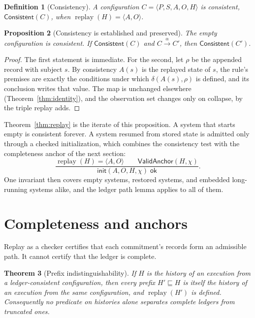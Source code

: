 \documentclass[11pt,openany]{book}
\newtheorem{theorem}{Theorem}[chapter]
\newtheorem{proposition}[theorem]{Proposition}
\newtheorem{definition}[theorem]{Definition}
\theoremstyle{remark}
\newcommand{\replay}{\operatorname{replay}}
\begin{document}
\begin{definition}[Consistency]
A configuration $C=\langle P,S,A,O,H\rangle$ is \emph{consistent},
$\mathsf{Consistent}(C)$, when $\replay(H)=\langle A,O\rangle$.
\end{definition}

\begin{proposition}[Consistency is established and preserved]
\label{prop:consistent}
The empty configuration is consistent. If $\mathsf{Consistent}(C)$ and
$C\xrightarrow{\alpha}C'$, then $\mathsf{Consistent}(C')$.
\end{proposition}

\begin{proof}
The first statement is immediate. For the second, let $\rho$ be the
appended record with subject $s$. By consistency $A(s)$ is the replayed
state of $s$, the rule's premises are exactly the conditions under which
$\delta(A(s),\rho)$ is defined, and its conclusion writes that value. The
map is unchanged elsewhere (Theorem~\ref{thm:identity}), and the
observation set changes only on collapse, by the triple replay adds.
\end{proof}

Theorem~\ref{thm:replay} is the iterate of this proposition. A system that
starts empty is consistent forever. A system resumed from stored state is
admitted only through a checked initialization, which combines the
consistency test with the completeness anchor of the next section:
\[
\frac{\replay(H)=\langle A,O\rangle\qquad
\mathsf{ValidAnchor}(H,\chi)}
{\mathsf{init}(A,O,H,\chi)\;\mathsf{ok}}.
\]
One invariant then covers empty systems, restored systems, and embedded
long-running systems alike, and the ledger path lemma applies to all of
them.

\section{Completeness and anchors}

Replay as a checker certifies that each commitment's records form an
admissible path. It cannot certify that the ledger is complete.

\begin{theorem}[Prefix indistinguishability]\label{thm:prefix}
If $H$ is the history of an execution from a ledger-consistent
configuration, then every prefix $H'\sqsubseteq H$ is itself the history
of an execution from the same configuration, and $\replay(H')$ is defined.
Consequently no predicate on histories alone separates complete ledgers
from truncated ones.
\end{theorem}
\end{document}

